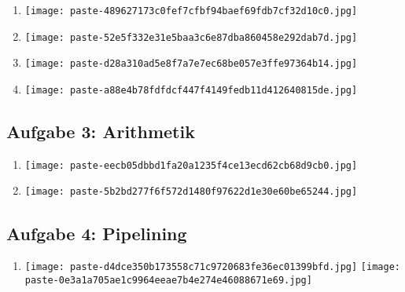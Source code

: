 \documentclass[12pt,a4paper]{article}
\begin{document}
\begin{enumerate}[label=\alph*), topsep=5pt, itemsep=10pt]
\item \mbox{}\begin{center}\texttt{[image: paste-489627173c0fef7cfbf94baef69fdb7cf32d10c0.jpg]}
\end{center}
\item \mbox{}\begin{center}\texttt{[image: paste-52e5f332e31e5baa3c6e87dba860458e292dab7d.jpg]}
\end{center}
\item \mbox{}\begin{center}\texttt{[image: paste-d28a310ad5e8f7a7e7ec68be057e3ffe97364b14.jpg]}
\end{center}
\item \mbox{}\begin{center}\texttt{[image: paste-a88e4b78fdfdcf447f4149fedb11d412640815de.jpg]}
\end{center}
\end{enumerate}
\clearpage
\subsection*{Aufgabe 3: Arithmetik}

\begin{enumerate}[label=\alph*), topsep=5pt, itemsep=10pt]
\item \mbox{}\begin{center}\texttt{[image: paste-eecb05dbbd1fa20a1235f4ce13ecd62cb68d9cb0.jpg]}
\end{center}
\item \mbox{}\begin{center}\texttt{[image: paste-5b2bd277f6f572d1480f97622d1e30e60be65244.jpg]}
\end{center}
\end{enumerate}
\clearpage
\subsection*{Aufgabe 4: Pipelining}

\begin{enumerate}[label=\alph*), topsep=5pt, itemsep=10pt]
\item \mbox{}\begin{center}\texttt{[image: paste-d4dce350b173558c71c9720683fe36ec01399bfd.jpg]}
\texttt{[image: paste-0e3a1a705ae1c9964eeae7b4e274e46088671e69.jpg]}
\end{center}
\end{enumerate}
\clearpage
\end{document}
